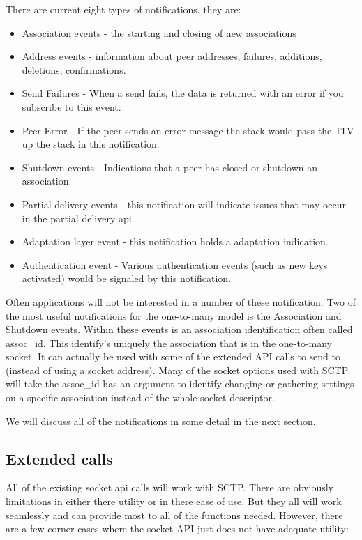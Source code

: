 \documentclass[conference]{IEEEtran}
\begin{document}
There are current eight types of notifications. they are:
\begin{itemize}
 \item  Association events - the starting and closing of new associations
 \item  Address events - information about peer addresses, failures, additions, deletions, confirmations.
 \item  Send Failures - When a send fails, the data is returned with an error if you subscribe to this event.
 \item  Peer Error - If the peer sends an error message the stack would pass the TLV up the stack in this notification.
 \item  Shutdown events - Indications that a peer has closed or shutdown an association.
 \item  Partial delivery events - this notification will indicate issues that may occur in the partial delivery api.
 \item  Adaptation layer event - this notification holds a adaptation indication.
 \item  Authentication event - Various authentication events (such as new keys activated) would be signaled by this notification.
 \end{itemize}

Often applications will not be interested in a number of these notification. Two of the most
useful notifications for the one-to-many model is the Association and Shutdown events. Within
these events is an association identification often called assoc\_id. This identify's uniquely the
association that is in the one-to-many socket. It can actually be used with some of the extended
API calls to send to (instead of using a socket address).  Many of the socket options used with
SCTP will take the assoc\_id has an argument to identify changing or gathering settings on
a specific association instead of the whole socket descriptor.

We will discuss all of the notifications in some detail in the next section.

\subsection{Extended calls}

All of the existing socket api calls will work with SCTP. There are
obviously limitations in either there utility or in there ease of use.
But they all will work seamlessly and can provide most to all of
the functions needed. However, there are a few corner cases
where the socket API just does not have adequate utility:
\end{document}
